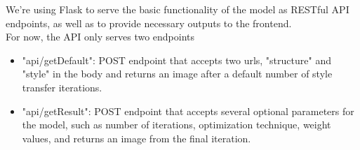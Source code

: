 We're using Flask to serve the basic functionality of the model as RESTful API endpoints, as well as to provide necessary outputs to the frontend.\\
For now, the API only serves two endpoints
\begin{itemize}
    \item "api/getDefault": POST endpoint that accepts two urls, "structure" and "style" in the body and returns an image after a default number of style transfer iterations.
    \item "api/getResult": POST endpoint that accepts several optional parameters for the model, such as number of iterations, optimization technique, weight values, and returns an image from the final iteration.
\end{itemize}